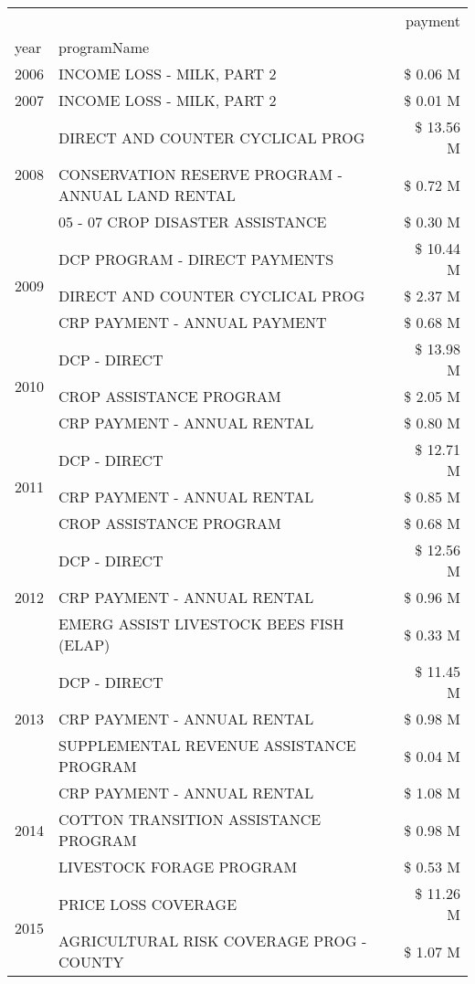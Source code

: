 \begin{tabular}{llr}
\toprule
 &  & payment \\
year & programName &  \\
\midrule
2006 & INCOME LOSS - MILK, PART 2 & \$ 0.06 M \\
\cline{1-3}
2007 & INCOME LOSS - MILK, PART 2 & \$ 0.01 M \\
\cline{1-3}
\multirow[t]{3}{*}{2008} & DIRECT AND COUNTER CYCLICAL PROG & \$ 13.56 M \\
 & CONSERVATION RESERVE PROGRAM - ANNUAL LAND RENTAL & \$ 0.72 M \\
 & 05 - 07 CROP DISASTER ASSISTANCE & \$ 0.30 M \\
\cline{1-3}
\multirow[t]{3}{*}{2009} & DCP PROGRAM - DIRECT PAYMENTS & \$ 10.44 M \\
 & DIRECT AND COUNTER CYCLICAL PROG & \$ 2.37 M \\
 & CRP PAYMENT - ANNUAL PAYMENT & \$ 0.68 M \\
\cline{1-3}
\multirow[t]{3}{*}{2010} & DCP - DIRECT & \$ 13.98 M \\
 & CROP ASSISTANCE PROGRAM & \$ 2.05 M \\
 & CRP PAYMENT - ANNUAL RENTAL & \$ 0.80 M \\
\cline{1-3}
\multirow[t]{3}{*}{2011} & DCP - DIRECT & \$ 12.71 M \\
 & CRP PAYMENT - ANNUAL RENTAL & \$ 0.85 M \\
 & CROP ASSISTANCE PROGRAM & \$ 0.68 M \\
\cline{1-3}
\multirow[t]{3}{*}{2012} & DCP - DIRECT & \$ 12.56 M \\
 & CRP PAYMENT - ANNUAL RENTAL & \$ 0.96 M \\
 & EMERG ASSIST LIVESTOCK BEES FISH (ELAP) & \$ 0.33 M \\
\cline{1-3}
\multirow[t]{3}{*}{2013} & DCP - DIRECT & \$ 11.45 M \\
 & CRP PAYMENT - ANNUAL RENTAL & \$ 0.98 M \\
 & SUPPLEMENTAL REVENUE ASSISTANCE PROGRAM & \$ 0.04 M \\
\cline{1-3}
\multirow[t]{3}{*}{2014} & CRP PAYMENT - ANNUAL RENTAL & \$ 1.08 M \\
 & COTTON TRANSITION ASSISTANCE PROGRAM & \$ 0.98 M \\
 & LIVESTOCK FORAGE PROGRAM & \$ 0.53 M \\
\cline{1-3}
\multirow[t]{3}{*}{2015} & PRICE LOSS COVERAGE & \$ 11.26 M \\
 & AGRICULTURAL RISK COVERAGE PROG - COUNTY & \$ 1.07 M \\

\end{tabular}
